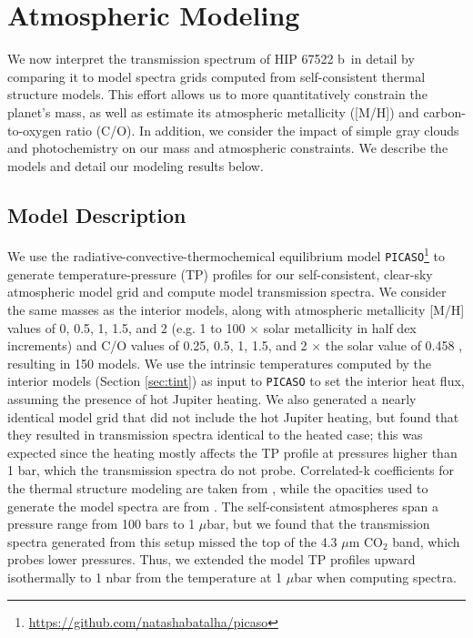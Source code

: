 \documentclass[twocolumn]{aastex63} %
\newcommand{\plname}{HIP 67522 b}
\begin{document}
\section{Atmospheric Modeling} \label{sec:atmosphere}

We now interpret the transmission spectrum of \plname\ in detail by comparing it to model spectra grids computed from self-consistent thermal structure models. This effort allows us to more quantitatively constrain the planet's mass, as well as estimate its atmospheric metallicity ([M/H]) and carbon-to-oxygen ratio (C/O). In addition, we consider the impact of simple gray clouds and photochemistry on our mass and atmospheric constraints. We describe the models and detail our modeling results below. 

\subsection{Model Description}\label{sec:modeldes}

We use the radiative-convective-thermochemical equilibrium model \texttt{PICASO}\footnote{\url{https://github.com/natashabatalha/picaso}} \citep{Batalha2019,Mukherjee2023} to generate temperature-pressure (TP) profiles for our self-consistent, clear-sky atmospheric model grid and compute model transmission spectra. We consider the same masses as the interior models, along with atmospheric metallicity [M/H] values of 0, 0.5, 1, 1.5, and 2 (e.g. 1 to 100 $\times$ solar metallicity in half dex increments) and C/O values of 0.25, 0.5, 1, 1.5, and 2 $\times$ the solar value of 0.458 \citep{Lodders2009}, resulting in 150 models. We use the intrinsic temperatures computed by the interior models (Section \ref{sec:tint}) as input to \texttt{PICASO} to set the interior heat flux, assuming the presence of hot Jupiter heating. We also generated a nearly identical model grid that did not include the hot Jupiter heating, but found that they resulted in transmission spectra identical to the heated case; this was expected since the heating mostly affects the TP profile at pressures higher than 1 bar, which the transmission spectra do not probe. Correlated-k coefficients for the thermal structure modeling are taken from \citet{lupu_2023_7542068}, while the opacities used to generate the model spectra are from \citet{natasha_batalha_2020_3759675,natasha_batalha_2022_6928501}. The self-consistent atmospheres span a pressure range from 100 bars to 1 $\mu$bar, but we found that the transmission spectra generated from this setup missed the top of the 4.3 $\mu$m CO$_2$ band, which probes lower pressures. Thus, we extended the model TP profiles upward isothermally to 1 nbar from the temperature at 1 $\mu$bar when computing spectra. 
\end{document}
